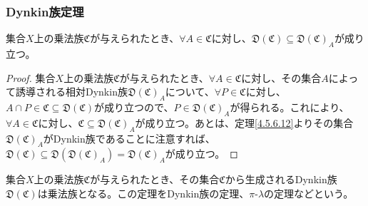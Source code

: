 \documentclass[dvipdfmx]{jsarticle}
\begin{document}
\subsubsection{Dynkin族定理}%
\begin{thm}\label{4.5.6.17}
集合$X$上の乗法族$\mathfrak{C}$が与えられたとき、$\forall A \in \mathfrak{C}$に対し、$\mathfrak{D}\left( \mathfrak{C} \right) \subseteq {\mathfrak{D}\left( \mathfrak{C} \right)}_{A}$が成り立つ。
\end{thm}
\begin{proof}
集合$X$上の乗法族$\mathfrak{C}$が与えられたとき、$\forall A\in \mathfrak{C}$に対し、その集合$A$によって誘導される相対Dynkin族${\mathfrak{D}\left( \mathfrak{C} \right)}_{A}$について、$\forall P\in \mathfrak{C}$に対し、$A \cap P\in \mathfrak{C \subseteq D}\left( \mathfrak{C} \right)$が成り立つので、$P \in {\mathfrak{D}\left( \mathfrak{C} \right)}_{A}$が得られる。これにより、$\forall A\in \mathfrak{C}$に対し、$\mathfrak{C}\subseteq {\mathfrak{D}\left( \mathfrak{C} \right)}_{A}$が成り立つ。あとは、定理\ref{4.5.6.12}よりその集合${\mathfrak{D}\left( \mathfrak{C} \right)}_{A}$がDynkin族であることに注意すれば、$\mathfrak{D}\left( \mathfrak{C} \right)\subseteq \mathfrak{D}\left( {\mathfrak{D}\left( \mathfrak{C} \right)}_{A} \right) = {\mathfrak{D}\left( \mathfrak{C} \right)}_{A}$が成り立つ。
\end{proof}
\begin{thm}[Dynkin族の定理]\label{4.5.6.18}
集合$X$上の乗法族$\mathfrak{C}$が与えられたとき、その集合$\mathfrak{C}$から生成されるDynkin族$\mathfrak{D}\left( \mathfrak{C} \right)$は乗法族となる。この定理をDynkin族の定理、$\pi$-$\lambda$の定理などという。
\end{thm}
\end{document}
